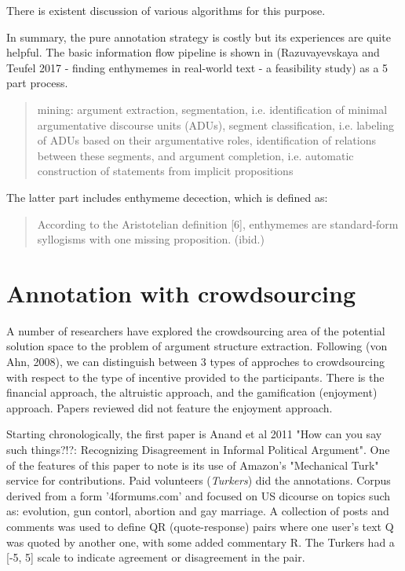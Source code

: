 \documentclass{report}
\begin{document}
There is existent discussion \cite{artstein_inter-coder_2008} of various algorithms for this purpose.

In summary, the pure annotation strategy is costly but its experiences are quite helpful. The basic information flow pipeline is shown in (Razuvayevskaya and Teufel 2017 - finding enthymemes in real-world text - a feasibility study) as a 5 part process.
\begin{quote}
   mining: argument extraction, segmentation, i.e. identification of minimal argumentative discourse units (ADUs), segment classification, i.e. labeling of ADUs based on their argumentative roles, identification of relations between these segments, and argument completion, i.e. automatic construction of statements from implicit propositions
\end{quote}
\cite[page 114]{Tefuel2017}


The latter part includes enthymeme decection, which is defined as:
\begin{quote}
According to the Aristotelian definition [6], enthymemes are standard-form syllogisms with one missing proposition.  (ibid.)
\end{quote}
\cite[page 113]{Tefuel2017}

\section{Annotation with crowdsourcing}
A number of researchers have explored the crowdsourcing area of the potential solution space to the problem of argument structure extraction.
Following (von Ahn, 2008), we can distinguish between 3 types of approches to crowdsourcing with respect to the type of incentive provided to the participants.
There is the financial approach, the altruistic approach, and the gamification (enjoyment) approach. Papers reviewed did not feature the enjoyment approach.

Starting chronologically, the first paper is Anand et al 2011 "How can you say such things?!?: Recognizing Disagreement in Informal Political Argument".
One of the features of this paper to note is its use of Amazon's "Mechanical Turk" service for contributions. Paid volunteers (\textit{Turkers}) did the annotations. 
Corpus derived from a form '4formums.com' and focused on US dicourse on topics such as: evolution, gun contorl, abortion and gay marriage. A collection of posts and comments was used to define QR (quote-response) pairs where one user's text Q was quoted by another one, with some added commentary R. The Turkers had a [-5, 5] scale to indicate agreement or disagreement in the pair.
\end{document}
